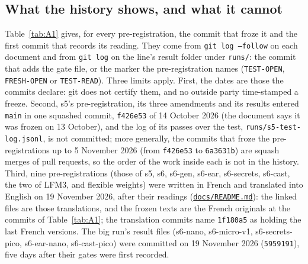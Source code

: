 \documentclass[10pt]{article}
\begin{document}
\subsection{What the history shows, and what it cannot}\label{sec:A.3}

Table~\ref{tab:A1} gives, for every pre-registration, the commit that froze it and the first commit that records its reading. They come from \texttt{git log --follow} on each document and from \texttt{git log} on the line's result folder under \texttt{runs/\allowbreak{}}: the commit that adds the gate file, or the marker the pre-registration names (\texttt{TEST-OPEN}, \texttt{FRESH-OPEN} or \texttt{TEST-READ}). Three limits apply. First, the dates are those the commits declare: git does not certify them, and no outside party time-stamped a freeze. Second, s5's pre-registration, its three amendments and its results entered \texttt{main} in one squashed commit, \texttt{f426e53} of 14 October 2026 (the document says it was frozen on 13 October), and the log of its passes over the test, \texttt{runs/\allowbreak{}s5-test-log.jsonl}, is not committed; more generally, the commits that froze the pre-registrations up to 5 November 2026 (from \texttt{f426e53} to \texttt{6a3631b}) are squash merges of pull requests, so the order of the work inside each is not in the history. Third, nine pre-registrations (those of s5, s6, s6-gen, s6-ear, s6-secrets, s6-cast, the two of LFM3, and flexible weights) were written in French and translated into English on 19 November 2026, after their readings (\href{https://github.com/maxgfr/skycmd/blob/main/docs/README.md}{\texttt{docs/\allowbreak{}README.md}}): the linked files are those translations, and the frozen texts are the French originals at the commits of Table~\ref{tab:A1}; the translation commits name \texttt{1f180a5} as holding the last French versions. The big run's result files (s6-nano, s6-micro-v1, s6-secrets-pico, s6-ear-nano, s6-cast-pico) were committed on 19 November 2026 (\texttt{5959191}), five days after their gates were first recorded.
\end{document}
